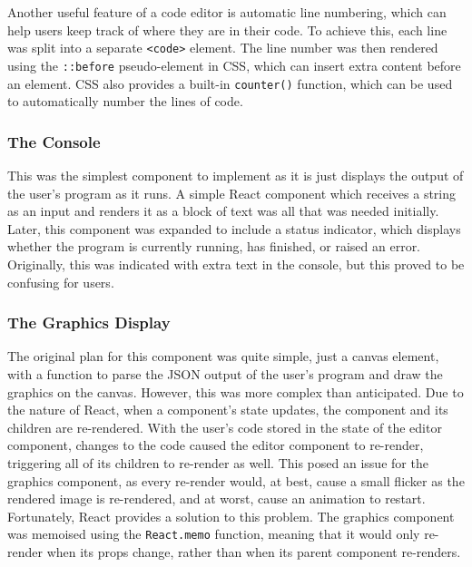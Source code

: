 \documentclass[../main.tex]{subfiles}
\begin{document}
                Another useful feature of a code editor is automatic line numbering, which can
                    help users keep track of where they are in their code.
                To achieve this, each line was split into a separate \texttt{<code>} element.
                The line number was then rendered using the \texttt{::before} pseudo-element in
                    CSS, which can insert extra content before an element.
                CSS also provides a built-in \texttt{counter()} function, which can be used to
                    automatically number the lines of code.

            \subsubsection{The Console}
                This was the simplest component to implement as it is just displays the output
                    of the user's program as it runs.
                A simple React component which receives a string as an input and renders it as
                    a block of text was all that was needed initially.
                Later, this component was expanded to include a status indicator, which
                    displays whether the program is currently running, has finished, or raised an
                    error.
                Originally, this was indicated with extra text in the console, but this proved
                    to be confusing for users.

            \subsubsection{The Graphics Display}
                The original plan for this component was quite simple, just a canvas element,
                    with a function to parse the JSON output of the user's program and draw the
                    graphics on the canvas.
                However, this was more complex than anticipated.
                Due to the nature of React, when a component's state updates, the component and
                    its children are re-rendered.
                With the user's code stored in the state of the editor component, changes to
                    the code caused the editor component to re-render, triggering all of its
                    children to re-render as well.
                This posed an issue for the graphics component, as every re-render would, at
                    best, cause a small flicker as the rendered image is re-rendered, and at worst,
                    cause an animation to restart.
                Fortunately, React provides a solution to this problem.
                The graphics component was memoised using the \texttt{React.memo} function,
                    meaning that it would only re-render when its props change, rather than when
                    its parent component re-renders.
\end{document}
